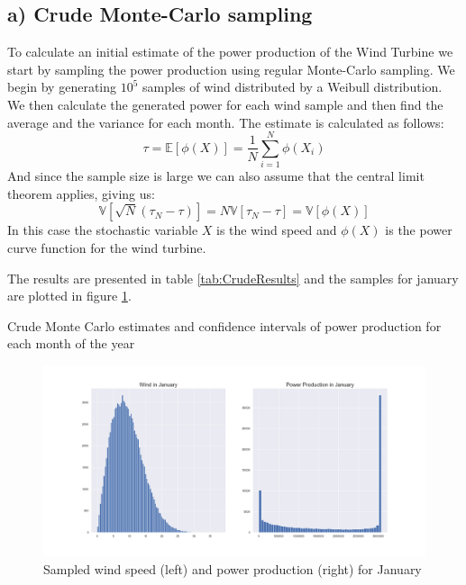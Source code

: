 \documentclass[a4paper]{article}
\begin{document}
\subsection*{a) Crude Monte-Carlo sampling}
To calculate an initial estimate of the power production of the Wind Turbine we start by sampling the power production using regular Monte-Carlo sampling. We begin by generating $10^5$ samples of wind distributed by a Weibull distribution. We then calculate the generated power for each wind sample and then find the average and the variance for each month. The estimate is calculated as follows:
\begin{equation}
    \tau = \mathbb{E}[\phi(X)] = \frac{1}{N}\sum_{i = 1}^N\phi(X_i)
\end{equation}
And since the sample size is large we can also assume that the central limit theorem applies, giving us:
\begin{equation}
    \mathbb{V}[\sqrt{N}(\tau_N-\tau)] = N\mathbb{V}[\tau_N-\tau] = \mathbb{V}[\phi(X)]
\end{equation}
In this case the stochastic variable $X$ is the wind speed and $\phi(X)$ is the power curve function for the wind turbine.

The results are presented in table \ref{tab:CrudeResults} and the samples for january are plotted in figure \ref{fig:samplesJan}.
\begin{table}[H]
    \centering
    \caption{Crude Monte Carlo estimates and confidence intervals of power production for each month of the year}
    \label{tab:CrudeResults}
    
\end{table}

\begin{figure}[H]
    \centering
    \includegraphics[width = 1.0\textwidth]{images/janCrudeMC}
    \caption{Sampled wind speed (left) and power production (right) for January}
    \label{fig:samplesJan}
\end{figure}
\end{document}
